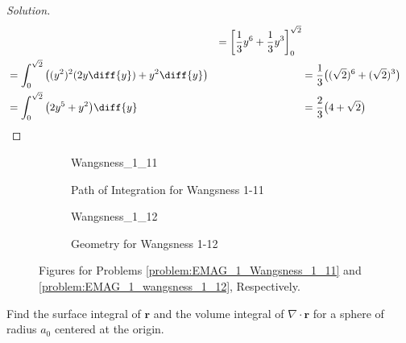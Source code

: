 \documentclass[crop=false,class=book,oneside]{standalone}
\begin{document}
\begin{proof}[Solution]
\begin{align*}
                    &
                    &=\bigg[
                         \frac{1}{3}y^{6}
                        +\frac{1}{3}y^{3}
                    \bigg]_{0}^{\sqrt{2}}\\
                    &=\int_{0}^{\sqrt{2}}
                      \big((y^{2})^{2}(2y\diff{y})+y^{2}\diff{y}\big)
                    &
                    &=\frac{1}{3}\big(
                        (\sqrt{2})^{6}+(\sqrt{2})^{3}
                    \big)\\
                    &=\int_{0}^{\sqrt{2}}
                      \big(2y^{5}+y^{2}\big)\diff{y}
                    &
                    &=\frac{2}{3}\big(4+\sqrt{2}\big)\\
                \end{align*}
            \end{proof}
            \begin{figure}[H]
                \centering
                \captionsetup{type=figure}
                \begin{subfigure}[b]{0.49\textwidth}
                    \centering
                    \captionsetup{type=figure}
                    {Wangsness_1_11}
                    \caption{Path of Integration for Wangsness 1-11}
                    \label{%
                        fig:EMAG_1_path_of_integration_%
                        for_wangsness_1_11%
                    }
                \end{subfigure}
                \begin{subfigure}[b]{0.49\textwidth}
                    \centering
                    \captionsetup{type=figure}
                    {Wangsness_1_12}
                    \caption{Geometry for Wangsness 1-12}
                    \label{fig:EMAG_1_geometry_for_wangsness_1_12}
                \end{subfigure}
                \caption[Figures for Wangsness 1-11 and 1-12]{%
                    Figures for Problems
                    \ref{problem:EMAG_1_Wangsness_1_11} and
                    \ref{problem:EMAG_1_wangsness_1_12}, Respectively.
                }
                \label{fig:EMAG_1_figures_for_wangsness_1_11_and_1_12}
            \end{figure}
            \begin{problem}[Wangsness 1-12]
                \label{problem:EMAG_1_wangsness_1_12}
                Find the surface integral of $\mathbf{r}$ and the
                volume integral of $\nabla\cdot\mathbf{r}$
                for a sphere of radius $a_{0}$
                centered at the origin.
            \end{problem}
\end{document}
